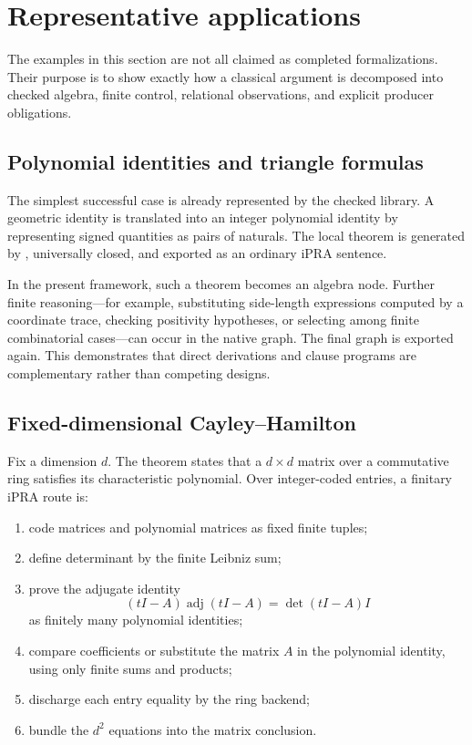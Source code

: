 \section{Representative applications}

The examples in this section are not all claimed as completed formalizations.
Their purpose is to show exactly how a classical argument is decomposed into
checked algebra, finite control, relational observations, and explicit
producer obligations.

\subsection{Polynomial identities and triangle formulas}

The simplest successful case is already represented by the checked
 library.  A geometric identity is translated into an
integer polynomial identity by representing signed quantities as pairs of
naturals.  The local theorem is generated by , universally
closed, and exported as an ordinary iPRA sentence.

In the present framework, such a theorem becomes an algebra node.  Further
finite reasoning---for example, substituting side-length expressions computed
by a coordinate trace, checking positivity hypotheses, or selecting among
finite combinatorial cases---can occur in the native graph.  The final graph is
exported again.  This demonstrates that direct derivations and clause programs
are complementary rather than competing designs.

\subsection{Fixed-dimensional Cayley--Hamilton}

Fix a dimension \(d\).  The theorem states that a \(d\times d\) matrix over a
commutative ring satisfies its characteristic polynomial.  Over integer-coded
entries, a finitary iPRA route is:

\begin{enumerate}
\item code matrices and polynomial matrices as fixed finite tuples;
\item define determinant by the finite Leibniz sum;
\item prove the adjugate identity
\[
   (tI-A)\operatorname{adj}(tI-A)=\det(tI-A)I
\]
as finitely many polynomial identities;
\item compare coefficients or substitute the matrix \(A\) in the polynomial
identity, using only finite sums and products;
\item discharge each entry equality by the ring backend;
\item bundle the \(d^2\) equations into the matrix conclusion.
\end{enumerate}

